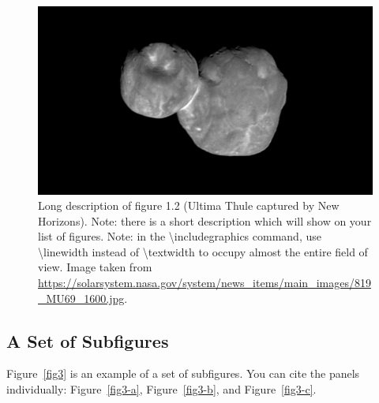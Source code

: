 \begin{landscape}
\begin{figure}[htb!]
\center
\includegraphics[width=\linewidth]{figures/819_MU69_1600.jpg}
\caption[Shot description of the figure 1.2.]{Long description of figure 1.2 (Ultima Thule captured by New Horizons). Note: there is a short description which will show on your list of figures. Note: in the  \textbackslash{includegraphics} command, use \textbackslash{linewidth} instead of \textbackslash{textwidth} to occupy almost the entire field of view. Image taken from \url{https://solarsystem.nasa.gov/system/news_items/main_images/819_MU69_1600.jpg}.}
\label{fig2}
\end{figure}
\end{landscape}

\subsection{A Set of Subfigures}
Figure~\ref{fig3} is an example of a set of subfigures. You can cite the panels individually: Figure~\ref{fig3-a}, Figure~\ref{fig3-b}, and Figure~\ref{fig3-c}.


